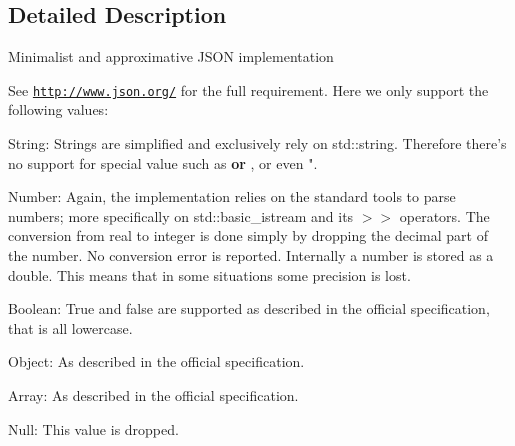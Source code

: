 \subsection{Detailed Description}
Minimalist and approximative J\-S\-O\-N implementation

See \href{http://www.json.org/}{\tt http\-://www.\-json.\-org/} for the full requirement. Here we only support the following values\-:

String\-: Strings are simplified and exclusively rely on std\-::string. Therefore there's no support for special value such as {\bfseries or} , or even ".

Number\-: Again, the implementation relies on the standard tools to parse numbers; more specifically on std\-::basic\-\_\-istream and its $>$$>$ operators. The conversion from real to integer is done simply by dropping the decimal part of the number. No conversion error is reported. Internally a number is stored as a double. This means that in some situations some precision is lost.

Boolean\-: True and false are supported as described in the official specification, that is all lowercase.

Object\-: As described in the official specification.

Array\-: As described in the official specification.

Null\-: This value is dropped. 

